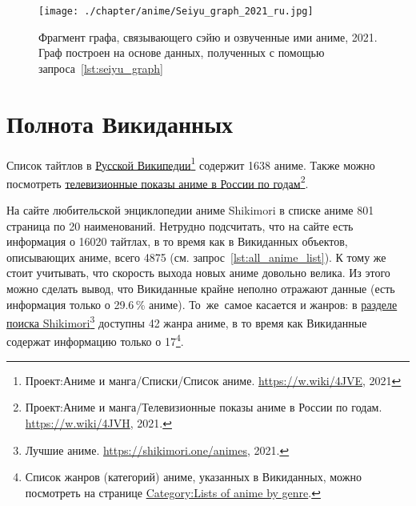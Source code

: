\newpage
\begin{figure*}[h!]
	\texttt{[image: ./chapter/anime/Seiyu\_graph\_2021\_ru.jpg]}\centering
	\caption[Граф сэйю и аниме, 2021 год.]{Фрагмент графа, связывающего сэйю и озвученные ими аниме, 2021. Граф построен на основе данных, полученных с помощью запроса~\protect\ref{lst:seiyu_graph}}%
      \label{fig:Seiyu_graph_2021_ru}%
\end{figure*} 




\section{Полнота Викиданных}

Список тайтлов в \href{https://w.wiki/4JVE}{Русской Википедии}\footnote{Проект:Аниме и манга/Списки/Список аниме. \href{https://w.wiki/4JVE}{https://w.wiki/4JVE}, 2021} содержит \num{1638} аниме. Также можно посмотреть \href{https://w.wiki/4JVH}{телевизионные показы аниме в России по годам}\footnote{Проект:Аниме и манга/Телевизионные показы аниме в России по годам. \href{https://w.wiki/4JVH}{https://w.wiki/4JVH}, 2021.}.

На сайте любительской энциклопедии аниме Shikimori\autocite{shikimori} 
в списке аниме \num{801} страница по 20 наименований. 
Нетрудно подсчитать, что на сайте есть информация о \num{16020} тайтлах, 
в то время как в Викиданных объектов, описывающих аниме, всего \num{4875} 
(см. запрос~\ref{lst:all_anime_list}). 
К тому же стоит учитывать, что скорость выхода новых аниме довольно велика. 
Из этого можно сделать вывод, что Викиданные крайне неполно отражают данные 
(есть информация только о \num{29.6}\,\% аниме). То~же~самое касается и жанров: 
в \href{https://shikimori.one/animes}{разделе поиска Shikimori}\footnote{%
%
    Лучшие аниме. \href{https://shikimori.one/animes}{https://shikimori.one/animes}, 2021.%
%
} доступны 42 жанра аниме, 
в то время как Викиданные содержат информацию только о 17\footnote{%
%
    Список жанров (категорий) аниме, указанных в Викиданных, 
    можно посмотреть на странице 
    \href{https://en.wikipedia.org/wiki/Category:Lists\_of_anime\_by\_genre}{Category:Lists of anime by genre}.%
}.


